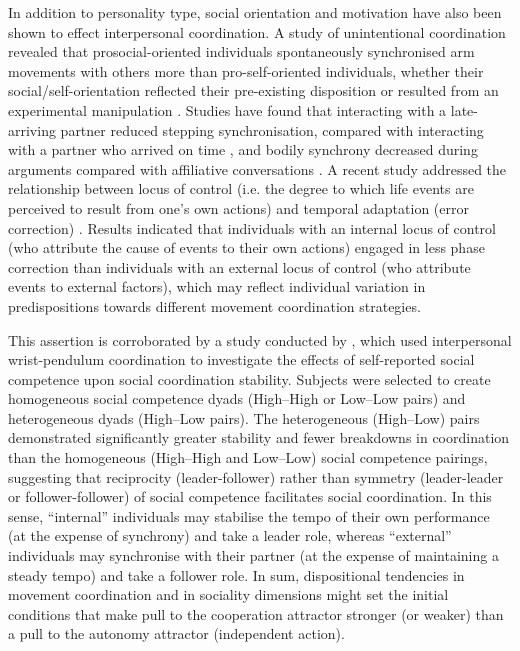\begin{CJK}{UTF8}{gbsn}
In addition to personality type, social orientation and motivation have also been shown to effect interpersonal coordination.  A study of unintentional coordination revealed that prosocial-oriented individuals spontaneously synchronised arm movements with others more than pro-self-oriented individuals, whether their social/self-orientation reflected their pre-existing disposition or resulted from an experimental manipulation \citep{Lumsden2012}.  Studies have found that interacting with a late-arriving partner reduced stepping synchronisation, compared with interacting with a partner who arrived on time \citep{Miles2010}, and bodily synchrony decreased during arguments compared with affiliative conversations \citep{Paxton2013}.  A recent study addressed the relationship between locus of control (i.e. the degree to which life events are perceived to result from one’s own actions) and temporal adaptation (error correction) \citep{Fairhurst2014}.   Results indicated that individuals with an internal locus of control (who attribute the cause of events to their own actions) engaged in less phase correction than individuals with an external locus of control (who attribute events to external factors), which may reflect individual variation in predispositions towards different movement coordination strategies.

This assertion is corroborated by a study conducted by \textcite{Schmidt1994}, which used interpersonal wrist-pendulum coordination to investigate the effects of self-reported social competence \citep[c.f.][]{Riggio1996} upon social coordination stability.  Subjects were selected to create homogeneous social competence dyads (High–High or Low–Low pairs) and heterogeneous dyads (High–Low pairs). The heterogeneous (High–Low) pairs demonstrated significantly greater stability and fewer breakdowns in coordination than the homogeneous (High–High and Low–Low) social competence pairings, suggesting that reciprocity (leader-follower) rather than symmetry (leader-leader or follower-follower) of social competence facilitates social coordination.  In this sense,  ``internal'' individuals may stabilise the tempo of their own performance (at the expense of synchrony) and take a leader role, whereas ``external'' individuals may synchronise with their partner (at the expense of maintaining a steady tempo) and take a follower role.  In sum,  dispositional tendencies in movement coordination and in sociality dimensions might set the initial conditions that make pull to the cooperation attractor stronger (or weaker) than a pull to the autonomy attractor (independent action).


\end{CJK}
